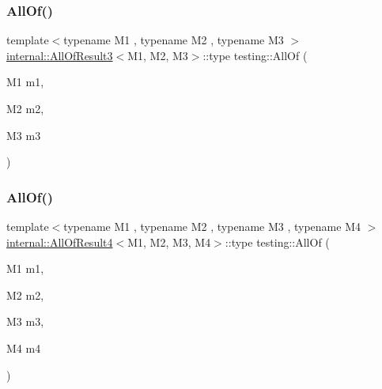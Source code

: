 \mbox{\label{namespacetesting_a75934d8ea6b986d2157a5ebfe68f9904}} 
\subsubsection{\texorpdfstring{AllOf()}{AllOf()}\hspace{0.1cm}{\footnotesize\ttfamily [2/9]}}
{\footnotesize\ttfamily template$<$typename M1 , typename M2 , typename M3 $>$ \\
\mbox{\hyperlink{structtesting_1_1internal_1_1AllOfResult3}{internal\+::\+All\+Of\+Result3}}$<$M1, M2, M3$>$\+::type testing\+::\+All\+Of (\begin{DoxyParamCaption}\item[{M1}]{m1,  }\item[{M2}]{m2,  }\item[{M3}]{m3 }\end{DoxyParamCaption})\hspace{0.3cm}{\ttfamily [inline]}}

\mbox{\label{namespacetesting_a4a9a119cde16e43b364f3573136857a1}} 
\subsubsection{\texorpdfstring{AllOf()}{AllOf()}\hspace{0.1cm}{\footnotesize\ttfamily [3/9]}}
{\footnotesize\ttfamily template$<$typename M1 , typename M2 , typename M3 , typename M4 $>$ \\
\mbox{\hyperlink{structtesting_1_1internal_1_1AllOfResult4}{internal\+::\+All\+Of\+Result4}}$<$M1, M2, M3, M4$>$\+::type testing\+::\+All\+Of (\begin{DoxyParamCaption}\item[{M1}]{m1,  }\item[{M2}]{m2,  }\item[{M3}]{m3,  }\item[{M4}]{m4 }\end{DoxyParamCaption})\hspace{0.3cm}{\ttfamily [inline]}}

\mbox{\label{namespacetesting_ab8f5e6cf1c22acf51a2b9b376b0ef03a}} 
